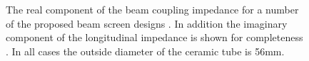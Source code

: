 \begin{figure}
\begin{center}
\end{center}
\caption{The real component of the beam coupling impedance for a number of the proposed beam screen designs . In addition the imaginary component of the longitudinal impedance is shown for completeness . In all cases the outside diameter of the ceramic tube is 56mm.}
\end{figure}

